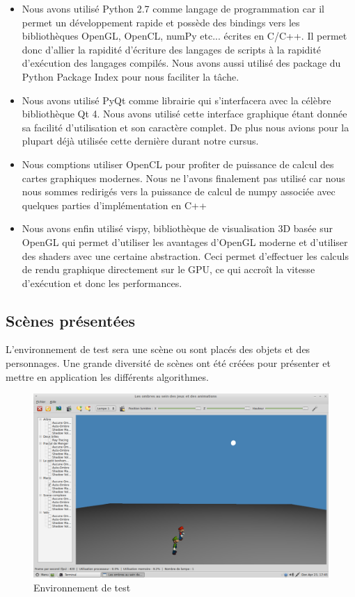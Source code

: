 \documentclass[a4paper,12pt]{report}
\begin{document}
\begin{itemize}
\item{Nous avons utilisé Python 2.7 comme langage de programmation car il permet un développement rapide et possède des bindings vers les bibliothèques OpenGL, OpenCL, numPy etc... écrites en C/C++. Il permet donc d'allier la rapidité d'écriture des langages de scripts à la rapidité d'exécution des langages compilés. Nous avons aussi utilisé des package du Python Package Index pour nous faciliter la t\^ache.}

\item{Nous avons utilisé PyQt comme librairie qui s'interfacera avec la célèbre bibliothèque Qt 4. Nous avons utilisé cette interface graphique étant donnée sa facilité d'utilisation et son caractère complet. De plus nous avions pour la plupart déjà utilisée cette dernière durant notre cursus.}

\item{Nous comptions utiliser OpenCL pour profiter de puissance de calcul des cartes graphiques modernes. Nous ne l'avons finalement pas utilisé car nous nous sommes redirigés vers la puissance de calcul de numpy associée avec quelques parties d'implémentation en C++}

\item{Nous avons enfin utilisé vispy, bibliothèque de visualisation 3D basée sur OpenGL qui permet d'utiliser les avantages d'OpenGL moderne et d'utiliser des shaders avec une certaine abstraction. Ceci permet d'effectuer les calculs de rendu graphique directement sur le GPU, ce qui accro\^it la vitesse d'exécution et donc les performances.
}
\end{itemize}

\subsection{Scènes présentées}

L'environnement de test sera une scène ou sont placés des objets et des personnages. Une grande diversité de scènes ont été créées pour présenter et mettre en application les différents algorithmes. 

\begin{figure}[H]
\includegraphics[scale=0.31]{images/exemple-scene.png}
\centering
\caption{Environnement de test}
\end{figure}
\end{document}
